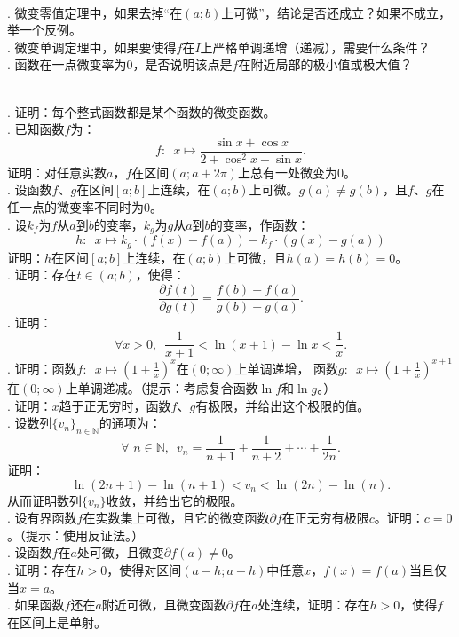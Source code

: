 \documentclass[12pt,UTF8]{ctexbook}
\begin{document}
\begin{sk}
    \mbox{} \\
    . 微变零值定理中，如果去掉“在$(a; b)$上可微”，结论是否还成立？如果不成立，举一个反例。\\
    . 微变单调定理中，如果要使得$f$在$I$上严格单调递增（递减），需要什么条件？\\
    . 函数在一点微变率为$0$，是否说明该点是$f$在附近局部的极小值或极大值？
\end{sk}

\begin{xt}
    \mbox{} \\
    . 证明：每个整式函数都是某个函数的微变函数。\\
    . 已知函数$f$为：
    $$ f: \,\,\, x\mapsto \frac{\sin{x} + \cos{x}}{2 + \cos^2{x} - \sin{x}}.$$
    \indent 证明：对任意实数$a$，$f$在区间$(a; a + 2\pi)$上总有一处微变为$0$。\\
    . 设函数$f$、$g$在区间$[a; b]$上连续，在$(a; b)$上可微。$g(a) \neq g(b)$，且$f$、$g$在任一点的微变率不同时为$0$。\\
    . 设$k_f$为$f$从$a$到$b$的变率，$k_g$为$g$从$a$到$b$的变率，作函数：
    $$ h : \,\,\, x \mapsto k_g \cdot (f(x) - f(a)) - k_f \cdot (g(x) - g(a))$$
    \indent 证明：$h$在区间$[a; b]$上连续，在$(a; b)$上可微，且$h(a) = h(b) = 0$。\\
    . 证明：存在$t\in(a; b)$，使得：
    $$ \frac{\partial f (t)}{\partial g (t)} = \frac{f(b) - f(a)}{g(b) - g(a)}.$$
    . 证明：
    $$ \forall x > 0, \,\,\, \frac{1}{x+1} < \ln{(x+1)} - \ln{x} < \frac{1}{x}.$$
    . 证明：函数$f: \,\,\,x \mapsto \left(1 + \frac{1}{x}\right)^x$在$(0;\infty)$上单调递增，
    函数$g: \,\,\,x \mapsto \left(1 + \frac{1}{x}\right)^{x+1}$在$(0;\infty)$上单调递减。（提示：考虑复合函数$\ln{f}$和$\ln{g}$。）\\
    . 证明：$x$趋于正无穷时，函数$f$、$g$有极限，并给出这个极限的值。\\
    . 设数列$\{v_n\}_{n\in\mathbb{N}}$的通项为：
    $$ \forall \,\, n\in\mathbb{N},\,\,\, v_n = \frac{1}{n+1} + \frac{1}{n+2} + \cdots + \frac{1}{2n}. $$
    证明：
    $$ \ln{(2n + 1)} - \ln{(n + 1)}  < v_n < \ln{(2n)} - \ln{(n)}. $$
    从而证明数列$\{v_n\}$收敛，并给出它的极限。\\
    . 设有界函数$f$在实数集上可微，且它的微变函数$\partial f$在正无穷有极限$c$。证明：$c = 0$。（提示：使用反证法。）\\
    . 设函数$f$在$a$处可微，且微变$\partial f(a) \neq 0$。\\
    . 证明：存在$h>0$，使得对区间$(a-h;a+h)$中任意$x$，$f(x) = f(a)$当且仅当$x = a$。\\
    . 如果函数$f$还在$a$附近可微，且微变函数$\partial f$在$a$处连续，证明：存在$h>0$，使得$f$在区间上是单射。

\end{xt}
\end{document}
